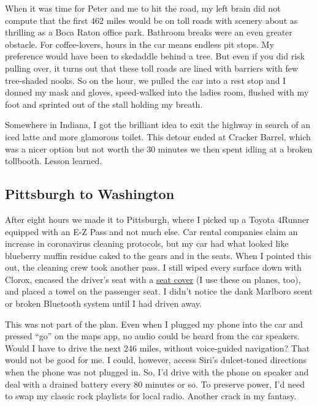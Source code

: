 When it was time for Peter and me to hit the road, my left brain did not
compute that the first 462 miles would be on toll roads with scenery
about as thrilling as a Boca Raton office park. Bathroom breaks were an
even greater obstacle. For coffee-lovers, hours in the car means endless
pit stops. My preference would have been to skedaddle behind a tree. But
even if you did risk pulling over, it turns out that these toll roads
are lined with barriers with few tree-shaded nooks. So on the hour, we
pulled the car into a rest stop and I donned my mask and gloves,
speed-walked into the ladies room, flushed with my foot and sprinted out
of the stall holding my breath.

Somewhere in Indiana, I got the brilliant idea to exit the highway in
search of an iced latte and more glamorous toilet. This detour ended at
Cracker Barrel, which was a nicer option but not worth the 30 minutes we
then spent idling at a broken tollbooth. Lesson learned.

\hypertarget{pittsburgh-to-washington}{%
\subsection{Pittsburgh to Washington}\label{pittsburgh-to-washington}}

After eight hours we made it to Pittsburgh, where I picked up a Toyota
4Runner equipped with an E-Z Pass and not much else. Car rental
companies claim an increase in coronavirus cleaning protocols, but my
car had what looked like blueberry muffin residue caked to the gears and
in the seats. When I pointed this out, the cleaning crew took another
pass. I still wiped every surface down with Clorox, encased the driver's
seat with a \href{https://seatsitters.com/}{seat cover} (I use these on
planes, too), and placed a towel on the passenger seat. I didn't notice
the dank Marlboro scent or broken Bluetooth system until I had driven
away.

This was not part of the plan. Even when I plugged my phone into the car
and pressed ``go'' on the maps app, no audio could be heard from the car
speakers. Would I have to drive the next 246 miles, without voice-guided
navigation? That would not be good for me. I could, however, access
Siri's dulcet-toned directions when the phone was not plugged in. So,
I'd drive with the phone on speaker and deal with a drained battery
every 80 minutes or so. To preserve power, I'd need to swap my classic
rock playlists for local radio. Another crack in my fantasy.

